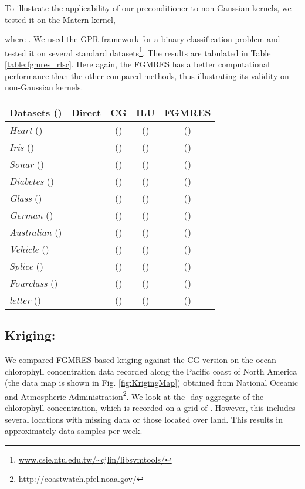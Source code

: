 \documentclass[10pt,journal,letterpaper,compsoc]{IEEEtran}
\begin{document}
To illustrate the applicability of our preconditioner to non-Gaussian kernels, we tested it on the Matern kernel\cite{GPR_Rasmussen},

where . We used the GPR framework for a binary classification problem and tested it on several standard datasets\footnote{\url{www.csie.ntu.edu.tw/~cjlin/libsvmtools/}}. The results are tabulated in Table \ref{table:fgmres_rlsc}. Here again, the FGMRES has a better computational performance than the other compared methods, thus illustrating its validity on non-Gaussian kernels.

\begin{table*}[bth]
\caption{\emph{Performance of FGMRES based Gaussian process regression against the direct, CG \cite{GPML_Mackay} and ILU-preconditioned solvers;  is the dimension and  is the size of the regression dataset with a non-Gaussian kernel (Matern). Total time taken for prediction is shown here, with the number of iterations for convergence indicated within parenthesis. The mean error in prediction between the two approaches was less than  in all the cases.}\label{table:fgmres_rlsc}}
\centering
\begin{tabular}{||l|c|c|c|c||}
\hline\hline
Datasets ()	& Direct \cite{GPML_Rasmussen} & CG \cite{GPML_Mackay} 	& ILU & FGMRES\\
\hline\hline
\emph{Heart} ()	&  	&  () 	&  () 	&  ()\\
\emph{Iris} ()	&  	&  () 	&  () 	&  ()\\
\emph{Sonar} ()	&  	&  () 	&  () 	&  ()\\
\emph{Diabetes} ()	&  	&  () 	&  () 	&  ()\\
\emph{Glass} ()	&  	&  () 	&  () 	&  ()\\
\emph{German} ()	&  	&  () 	&  () 	&  ()\\
\emph{Australian} ()	&  	&  () 	&  () 	&  ()\\
\emph{Vehicle} ()	&  	&  () 	&  () 	&  ()\\
\emph{Splice} ()	&  	&  () 	&  () 	&  ()\\
\emph{Fourclass} ()	&  	&  () 	&  () 	&  ()\\
\emph{letter} ()	&  	&  () 	&  () 	&  ()\\
\hline\hline
\end{tabular}
\end{table*}

\subsection{Kriging: }We compared FGMRES-based kriging against the CG version on the ocean chlorophyll concentration data recorded along the Pacific coast of North America (the data map is shown in Fig. \ref{fig:KrigingMap}) obtained from National Oceanic and Atmospheric Administration\footnote{\url{http://coastwatch.pfel.noaa.gov/}}. We look at the -day aggregate of the chlorophyll concentration, which is recorded on a grid of . However, this includes several locations with missing data or those located over land. This results in approximately  data samples per week.
\end{document}
